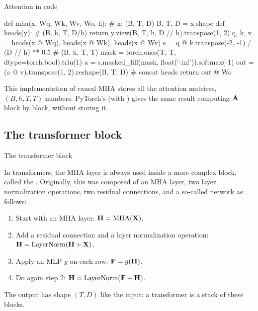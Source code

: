 \begin{frame}[fragile]{Attention in code}
    \setlength{\parskip}{5pt}

    \begin{python}[gobble=8,aboveskip=2pt,belowskip=4pt]
        def mha(x, Wq, Wk, Wv, Wo, h):                    # x: (B, T, D)
            B, T, D = x.shape
            def heads(y):                                 # (B, h, T, D/h)
                return y.view(B, T, h, D // h).transpose(1, 2)
            q, k, v = heads(x @ Wq), heads(x @ Wk), heads(x @ Wv)
            s = q @ k.transpose(-2, -1) / (D // h) ** 0.5 # (B, h, T, T)
            mask = torch.ones(T, T, dtype=torch.bool).triu(1)
            a = s.masked_fill(mask, float('-inf')).softmax(-1)
            out = (a @ v).transpose(1, 2).reshape(B, T, D) # concat heads
            return out @ Wo
    \end{python}

    This  implementation of causal MHA stores all the attention
    matrices, $(B,h,T,T)$ numbers. PyTorch's
     (with
    ) gives the same result computing $\boldsymbol{\mathbf{A}}$
    block by block, without storing it.

\end{frame}

\subsection{The transformer block}

\begin{frame}{The transformer block}
    \setlength{\parskip}{6pt}

    In transformers, the MHA layer is always used inside a more complex block,
    called the . Originally, this was composed of an
    MHA layer, two layer normalization operations, two residual connections,
    and a so-called  network as follows:
    \begin{enumerate}
        \item Start with an MHA layer: $\boldsymbol{\mathbf{H}}=\operatorname{MHA}(\boldsymbol{\mathbf{X}})$.
        \item Add a residual connection and a layer normalization operation:
              $\boldsymbol{\mathbf{H}}=\operatorname{LayerNorm}(\boldsymbol{\mathbf{H}}+\boldsymbol{\mathbf{X}})$.
        \item Apply an MLP $g$ on each row: $\boldsymbol{\mathbf{F}}=g(\boldsymbol{\mathbf{H}})$.
        \item Do again step 2: $\boldsymbol{\mathbf{H}}=\operatorname{LayerNorm}(\boldsymbol{\mathbf{F}}+\boldsymbol{\mathbf{H}})$.
    \end{enumerate}

    The output has shape $(T,D)$ like the input: a transformer is a stack of
    these blocks.


\end{frame}

